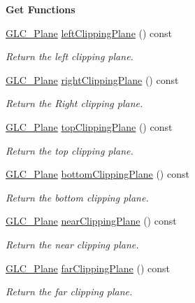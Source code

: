 \begin{Indent}{\bf Get Functions}\par
\begin{DoxyCompactItemize}
\item 
\hyperlink{class_g_l_c___plane}{G\-L\-C\-\_\-\-Plane} \hyperlink{class_g_l_c___frustum_ac9df25a55e5a0bb41b274ee957211005}{left\-Clipping\-Plane} () const 
\begin{DoxyCompactList}\small\item\em Return the left clipping plane. \end{DoxyCompactList}\item 
\hyperlink{class_g_l_c___plane}{G\-L\-C\-\_\-\-Plane} \hyperlink{class_g_l_c___frustum_a008826f05d5f278cb35e2fae38ef0ef2}{right\-Clipping\-Plane} () const 
\begin{DoxyCompactList}\small\item\em Return the Right clipping plane. \end{DoxyCompactList}\item 
\hyperlink{class_g_l_c___plane}{G\-L\-C\-\_\-\-Plane} \hyperlink{class_g_l_c___frustum_ac771bba0e41f77fc74091acc75613da6}{top\-Clipping\-Plane} () const 
\begin{DoxyCompactList}\small\item\em Return the top clipping plane. \end{DoxyCompactList}\item 
\hyperlink{class_g_l_c___plane}{G\-L\-C\-\_\-\-Plane} \hyperlink{class_g_l_c___frustum_a5c3c1856e80e38ce12fc8a49627acf7b}{bottom\-Clipping\-Plane} () const 
\begin{DoxyCompactList}\small\item\em Return the bottom clipping plane. \end{DoxyCompactList}\item 
\hyperlink{class_g_l_c___plane}{G\-L\-C\-\_\-\-Plane} \hyperlink{class_g_l_c___frustum_ab74cdcfe2df8971c999316485e6cc03b}{near\-Clipping\-Plane} () const 
\begin{DoxyCompactList}\small\item\em Return the near clipping plane. \end{DoxyCompactList}\item 
\hyperlink{class_g_l_c___plane}{G\-L\-C\-\_\-\-Plane} \hyperlink{class_g_l_c___frustum_a2e3c3fb079be2e5eaaf83e866c0276cd}{far\-Clipping\-Plane} () const 
\begin{DoxyCompactList}\small\item\em Return the far clipping plane. \end{DoxyCompactList}\item 

\end{DoxyCompactItemize}
\end{Indent}
